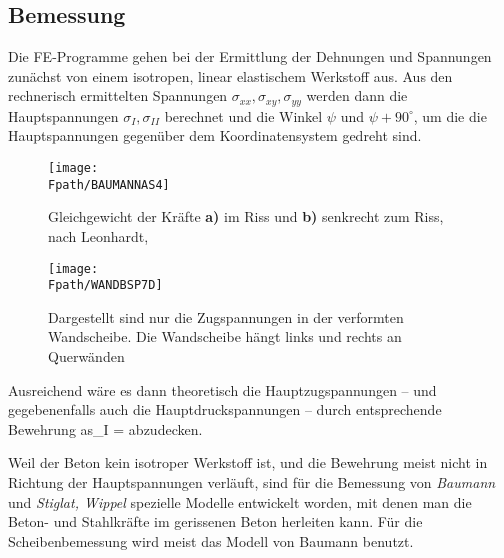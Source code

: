 {%
{\textcolor{sectionTitleBlue}{\section{Bemessung}}}\label{BemessungScheibe}
Die FE-Programme gehen bei der Ermittlung der Dehnungen und Spannungen zun\"{a}chst von einem isotropen, linear elastischem Werkstoff aus. Aus den rechnerisch ermittelten Spannungen $\sigma_{xx}, \sigma_{xy}, \sigma_{yy}$ werden dann die Hauptspannungen $\sigma_I, \sigma_{II}$ berechnet und die Winkel $\psi $ und $\psi  + 90^\circ$, um die die Hauptspannungen gegen\"{u}ber dem Koordinatensystem gedreht sind.
\begin{figure}[tbp] \centering
\if {} \sidecaption \fi
\texttt{[image: \\Fpath/BAUMANNAS4]}
\caption{Gleichgewicht der Kr\"{a}fte {\bf a)} im Riss und {\bf b)} senkrecht zum Riss, nach
Leonhardt, \protect\cite{Leonhardt}} \label{BaumannAs2}
\end{figure}%

\begin{figure}[tbp] \centering
\if {} \sidecaption \fi
\texttt{[image: \\Fpath/WANDBSP7D]}
\caption{Dargestellt sind nur die Zugspannungen in der verformten Wandscheibe. Die
Wandscheibe h\"{a}ngt links und rechts an Querw\"{a}nden} \label{WandBsp7}
\end{figure}%

Ausreichend w\"{a}re es dann theoretisch die Hauptzugspannungen -- und gegebenenfalls auch die Hauptdruckspannungen -- durch entsprechende Bewehrung
\bfo
as_I = 
\efo
abzudecken.

Weil der Beton kein isotroper Werkstoff ist, und die Bewehrung meist nicht in Richtung der Hauptspannungen verl\"{a}uft, sind f\"{u}r die Bemessung von {\em Baumann\/} \cite{Baumann1} und {\em Stiglat, Wippel\/} \cite{Stiglat} spezielle Modelle entwickelt worden, mit denen man die Beton- und Stahlkr\"{a}fte im gerissenen Beton herleiten kann. F\"{u}r die Scheibenbemessung wird meist das Modell von Baumann benutzt.

}

